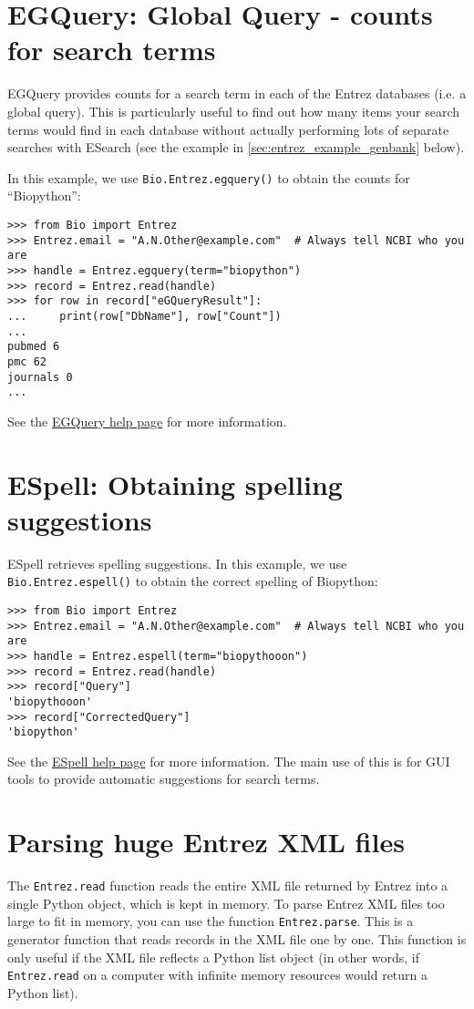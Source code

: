 \section{EGQuery: Global Query - counts for search terms}
EGQuery provides counts for a search term in each of the Entrez databases (i.e. a global query). This is particularly useful to find out how many items your search terms would find in each database without actually performing lots of separate searches with ESearch (see the example in \ref{sec:entrez_example_genbank} below).

In this example, we use \verb+Bio.Entrez.egquery()+ to obtain the counts for ``Biopython'':

\begin{verbatim}
>>> from Bio import Entrez
>>> Entrez.email = "A.N.Other@example.com"  # Always tell NCBI who you are
>>> handle = Entrez.egquery(term="biopython")
>>> record = Entrez.read(handle)
>>> for row in record["eGQueryResult"]:
...     print(row["DbName"], row["Count"])
...
pubmed 6
pmc 62
journals 0
...
\end{verbatim}
See the \href{https://www.ncbi.nlm.nih.gov/books/NBK25499/#chapter4.EGQuery}{EGQuery help page} for more information.

\section{ESpell: Obtaining spelling suggestions}
ESpell retrieves spelling suggestions. In this example, we use \verb+Bio.Entrez.espell()+ to obtain the correct spelling of Biopython:

\begin{verbatim}
>>> from Bio import Entrez
>>> Entrez.email = "A.N.Other@example.com"  # Always tell NCBI who you are
>>> handle = Entrez.espell(term="biopythooon")
>>> record = Entrez.read(handle)
>>> record["Query"]
'biopythooon'
>>> record["CorrectedQuery"]
'biopython'
\end{verbatim}
See the \href{https://www.ncbi.nlm.nih.gov/books/NBK25499/#chapter4.ESpell}{ESpell help page} for more information.
The main use of this is for GUI tools to provide automatic suggestions for search terms.

\section{Parsing huge Entrez XML files}

The \verb+Entrez.read+ function reads the entire XML file returned by Entrez into a single Python object, which is kept in memory. To parse Entrez XML files too large to fit in memory, you can use the function \verb+Entrez.parse+. This is a generator function that reads records in the XML file one by one. This function is only useful if the XML file reflects a Python list object (in other words, if \verb+Entrez.read+ on a computer with infinite memory resources would return a Python list).


